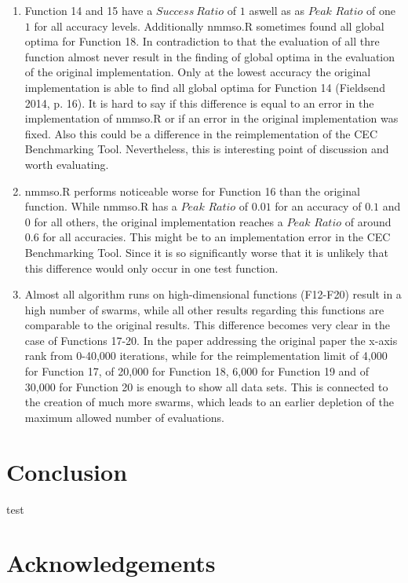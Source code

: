 \documentclass[12pt,a4paper]{article}
\begin{document}
\begin{enumerate}
\def\labelenumi{(\arabic{enumi})}
\item
  Function 14 and 15 have a \(Success\ Ratio\) of \(1\) aswell as as
  \(Peak\) \(Ratio\) of one \(1\) for all accuracy levels. Additionally
  nmmso.R sometimes found all global optima for Function 18. In
  contradiction to that the evaluation of all thre function almost never
  result in the finding of global optima in the evaluation of the
  original implementation. Only at the lowest accuracy the original
  implementation is able to find all global optima for Function 14
  (Fieldsend 2014, p. 16). It is hard to say if this difference is equal
  to an error in the implementation of nmmso.R or if an error in the
  original implementation was fixed. Also this could be a difference in
  the reimplementation of the CEC Benchmarking Tool. Nevertheless, this
  is interesting point of discussion and worth evaluating.
\item
  nmmso.R performs noticeable worse for Function 16 than the original
  function. While nmmso.R has a \(Peak\) \(Ratio\) of \(0.01\) for an
  accuracy of \(0.1\) and \(0\) for all others, the original
  implementation reaches a \(Peak\) \(Ratio\) of around \(0.6\) for all
  accuracies. This might be to an implementation error in the CEC
  Benchmarking Tool. Since it is so significantly worse that it is
  unlikely that this difference would only occur in one test function.
\item
  Almost all algorithm runs on high-dimensional functions (F12-F20)
  result in a high number of swarms, while all other results regarding
  this functions are comparable to the original results. This difference
  becomes very clear in the case of Functions 17-20. In the paper
  addressing the original paper the x-axis rank from 0-40,000
  iterations, while for the reimplementation limit of 4,000 for Function
  17, of 20,000 for Function 18, 6,000 for Function 19 and of 30,000 for
  Function 20 is enough to show all data sets. This is connected to the
  creation of much more swarms, which leads to an earlier depletion of
  the maximum allowed number of evaluations.
\end{enumerate}

\section{Conclusion}\label{conclusion}

test

\section{Acknowledgements}\label{acknowledgements}
\end{document}
